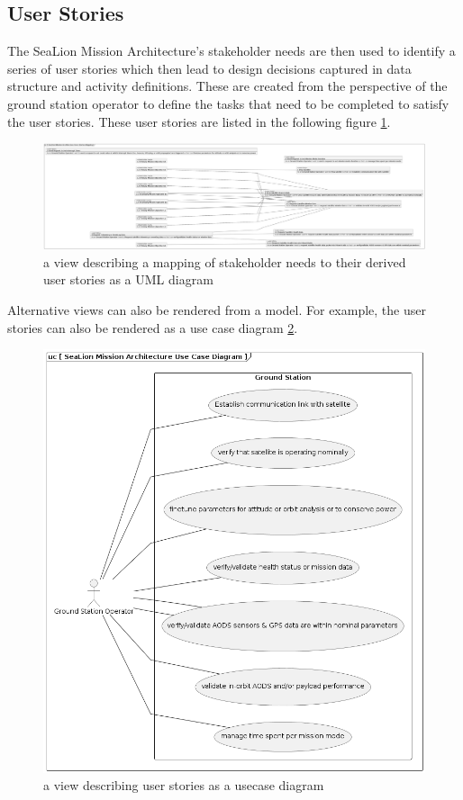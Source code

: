 \documentclass[conf]{new-aiaa}
\begin{document}
\subsection{User Stories}

The SeaLion Mission Architecture's stakeholder needs are then used to identify a series of user stories which then lead to design decisions captured in data structure and activity definitions. These are created from the perspective of the ground station operator to define the tasks that need to be completed to satisfy the user stories. These user stories are listed in the following figure \ref{user-stories-mapping}.

\begin{figure}[hbt!]
    \centering
    \includegraphics[width=.8\textwidth]{user-stories-mapping}
    \caption{a view describing a mapping of stakeholder needs to their derived user stories as a UML diagram}
    \label{user-stories-mapping}
\end{figure}

Alternative views can also be rendered from a model. For example, the user stories can also be rendered as a use case diagram \ref{use-case-diagram}.
\begin{figure}[hbt!]
    \centering
    \includegraphics[width=.8\textwidth]{use-case-diagram}
    \caption{a view describing user stories as a usecase diagram}
    \label{use-case-diagram}
\end{figure}
\\
\\
\\
\\
\end{document}
